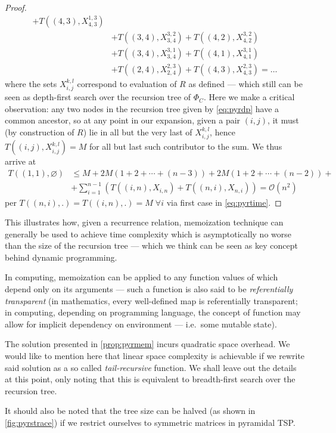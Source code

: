 \documentclass[index=totoc,bibliography=totoc]{scrartcl}
\newcommand{\annotation}[1]{\marginpar{\small\itshape\color{green}#1}}
\numberwithin{equation}{section}
\numberwithin{figure}{section}
\numberwithin{table}{section}
\let\defstyle\itshape
\begin{document}
\begin{proof}
\begin{align*}
         + T\left((4,3),X_{4,3}^{1,3}\right)
    \\ & + T\left((3,4),X_{3,4}^{3,2}\right)
         + T\left((4,2),X_{4,2}^{3,2}\right)
    \\ & + T\left((3,4),X_{3,4}^{3,1}\right)
         + T\left((4,1),X_{4,1}^{3,1}\right)
    \\ & + T\left((2,4),X_{2,4}^{2,3}\right)
         + T\left((4,3),X_{4,3}^{2,3}\right) = \ldots
  \end{align*}
  where the sets $X_{i,j}^{k,l}$ correspond to evaluation of $R$ as defined ---
  which still can be seen as depth-first search over the recursion tree of $\Phi_C$.
  Here we make a critical observation:
  any two nodes in the recursion tree given by \cref{eq:pyrdp} have a common ancestor,
  so at any point in our expansion,
  given a pair $(i,j)$, it must (by construction of $R$)
  lie in all but the very last of $X_{i,j}^{k,l}$,
  hence $T\left((i,j),X_{i,j}^{k,l}\right) = M$ for all but last such contributor to the sum.
  We thus arrive at
  \begin{align*}
    T\left((1,1),\varnothing\right) & \leq
    M + 2M \left(1 + 2 + \cdots + (n-3)\right) +
        2M \left(1 + 2 + \cdots + (n-2)\right) +
    \\
    & + \sum_{i=1}^{n-1} \left(
        T\left((i,n),X_{i,n}\right)
      + T\left((n,i),X_{n,i}\right)
    \right)
    = \mathcal{O}\left(n^2\right)
  \end{align*}
  per $T\left((n,i),.\right) = T\left((i,n),.\right) = M \; \forall i$
  via first case in \eqref{eq:pyrtime}.
\end{proof}

This illustrates how, given a recurrence relation, memoization technique
can generally be used to achieve time complexity which is asymptotically no
worse than the size of the recursion tree --- which we think can be seen as
key concept behind dynamic programming.

In computing, memoization can be applied to any function values of which
depend only on its arguments --- such a function is also said to be
{\defstyle referentially transparent} (in mathematics, every well-defined
map is referentially transparent; in computing, depending on programming
language, the concept of function may allow for implicit dependency on
environment --- i.e.\ some mutable state).

\begin{remark}
  The solution presented in \cref{prop:pyrmem} incurs quadratic space
  overhead.  We would like to mention here that linear space complexity is
  achievable if we rewrite said solution as a so called {\defstyle
    tail-recursive} function.  We shall leave out the details at this
  point, only noting that this is equivalent to breadth-first search over
  the recursion tree.

  It should also be noted that the tree size can be halved 
  (as shown in \cref{fig:pyrstrace})
  if we restrict ourselves to symmetric matrices in pyramidal TSP.
\end{remark}
\end{document}
